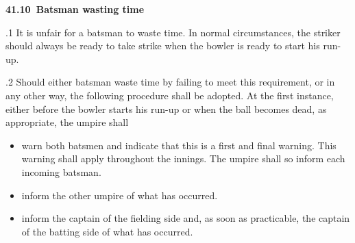\documentclass[12pt]{article}
\begin{document}
\vspace{\baselineskip}
{\fontsize{11pt}{13.2pt}\selectfont \textbf{41.10\  Batsman wasting time}\par}\par


\vspace{\baselineskip}
\begin{adjustwidth}{0.5in}{0.1in}
{\fontsize{9pt}{10.8pt}.1 It is unfair for a batsman to waste time. In normal circumstances, the striker should always be ready to take strike when the bowler is ready to start his run-up.\par}\par

\end{adjustwidth}


\vspace{\baselineskip}
\begin{adjustwidth}{0.5in}{0.12in}
{\fontsize{9pt}{10.8pt}.2 Should either batsman waste time by failing to meet this requirement, or in any other way, the following procedure shall be adopted. At the first instance, either before the bowler starts his run-up or when the ball becomes dead, as appropriate, the umpire shall\par}\par

\end{adjustwidth}


\vspace{\baselineskip}
\begin{itemize}
	\item {\fontsize{9pt}{10.8pt}\selectfont warn both batsmen and indicate that this is a first and final warning. This warning shall apply throughout the innings. The umpire shall so inform each incoming batsman.\par}\par


\vspace{\baselineskip}
	\item {\fontsize{9pt}{10.8pt}\selectfont inform the other umpire of what has occurred.\par}\par


\vspace{\baselineskip}
	\item {\fontsize{9pt}{10.8pt}\selectfont inform the captain of the fielding side and, as soon as practicable, the captain of the batting side of what has occurred.\par}
\end{itemize}\par
\end{document}
